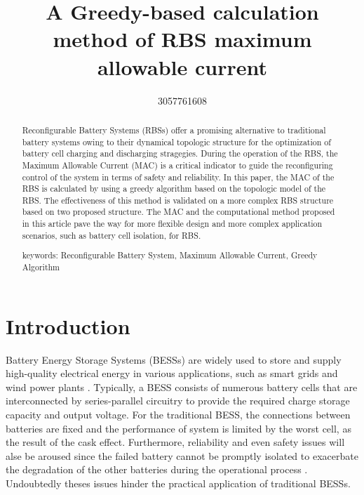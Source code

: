 \documentclass{article}
\title{A Greedy-based calculation method of RBS maximum allowable current}
\author{3057761608 }
\begin{document}
\maketitle

\begin{abstract}
    Reconfigurable Battery Systems (RBSs) offer a promising alternative to traditional battery systems owing to their dynamical topologic structure for the optimization of battery cell charging and discharging stragegies.
    During the operation of the RBS, the Maximum Allowable Current (MAC) is a critical indicator to guide the reconfiguring control of the system in terms of safety and reliability.
    In this paper, the MAC of the RBS is calculated by using a greedy algorithm based on the topologic model of the RBS.
    The effectiveness of this method is validated on a more complex RBS structure based on two proposed structure.
    The MAC and the computational method proposed in this article pave the way for more flexible design and more complex application scenarios, such as battery cell isolation, for RBS.


    keywords: Reconfigurable Battery System, Maximum Allowable Current, Greedy Algorithm
\end{abstract}

\section{Introduction}

Battery Energy Storage Systems (BESSs) are widely used to store and supply high-quality electrical energy in various applications, such as smart grids and wind power plants \cite{desiqueiraControlStrategySmooth2021,karandehTwoStageAlgorithmOptimal2019,yangBatteryEnergyStorage2018,choCommercialResearchBattery2015}.
Typically, a BESS consists of numerous battery cells that are interconnected by series-parallel circuitry to provide the required charge storage capacity and output voltage.
For the traditional BESS, the connections between batteries are fixed and the performance of system is limited by the worst cell, as the result of the cask effect.
Furthermore, reliability and even safety issues will alse be aroused since the failed battery cannot be promptly isolated to exacerbate the degradation of the other batteries during the operational process \cite{yangUnbalancedDischargingAging2016,fengPropagationMechanismsDiagnosis2019}.
Undoubtedly theses issues hinder the practical application of traditional BESSs.
\end{document}
